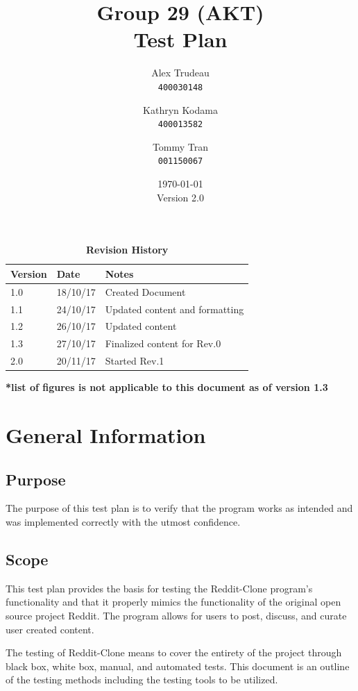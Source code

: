 \documentclass[12pt,fleqn]{article}
\title{Group 29 (AKT)\\ Test Plan}
\author{
Alex Trudeau\\
	\texttt{400030148}
\and
Kathryn Kodama\\
  	\texttt{400013582}
\and
Tommy Tran\\
	\texttt{001150067}
}
\date{\today\\Version 2.0}
\begin{document}
\maketitle



\pagebreak
\tableofcontents


\listoftables

\begin{table}[ht]
\caption{\bf Revision History}
\begin{tabularx}{\textwidth}{p{3cm}p{2cm}X}
\toprule {\bf Version} & {\bf Date} & {\bf Notes}\\
\midrule
1.0 & 18/10/17 & Created Document\\
1.1 & 24/10/17 & Updated  content and formatting\\
1.2 & 26/10/17 & Updated content\\
1.3 & 27/10/17 & Finalized content for Rev.0 \\
2.0 & 20/11/17 & Started Rev.1 \\
\bottomrule
\end{tabularx}
\textbf{*list of figures is not applicable to this document as of version 1.3}
\end{table}



\clearpage



\section {General Information}

\subsection {Purpose}
The purpose of this test plan is to verify that the program works as intended and was implemented correctly with the utmost confidence.

\subsection {Scope}
This test plan provides the basis for testing the Reddit-Clone program's functionality and that it properly mimics the functionality of the original open source project Reddit.  The program allows for users to post, discuss, and curate user created content.

The testing of Reddit-Clone means to cover the entirety of the project through black box, white box, manual, and automated tests.  This document is an outline of the testing methods including the testing tools to be utilized.
\end{document}
